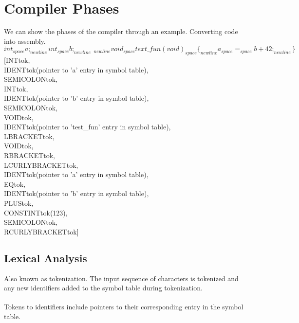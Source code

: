 \documentclass{report}
\begin{document}
    \section*{Compiler Phases}
        We can show the phases of the compiler through an example. Converting  code into  assembly.
        \[int_{space}a;_{newline}int_{space}b;_{newline} \ _{newline}void_{space}text\_fun(void)_{space}\{_{newline}a_{space}=_{space}b+42;_{newline}\}\]
        [INTtok,
        \\ IDENTtok(pointer to 'a' entry in symbol table),
        \\ SEMICOLONtok,
        \\ INTtok,
        \\ IDENTtok(pointer to 'b' entry in symbol table),
        \\ SEMICOLONtok,
        \\ VOIDtok,
        \\ IDENTtok(pointer to 'test\_fun' entry in symbol table),
        \\ LBRACKETtok,
        \\ VOIDtok,
        \\ RBRACKETtok,
        \\ LCURLYBRACKETtok,
        \\ IDENTtok(pointer to 'a' entry in symbol table),
        \\ EQtok,
        \\ IDENTtok(pointer to 'b' entry in symbol table),
        \\ PLUStok,
        \\ CONSTINTtok(123),
        \\ SEMICOLONtok,
        \\ RCURLYBRACKETtok]

        
        \subsection*{Lexical Analysis}
            Also known as tokenization. The input sequence of characters is tokenized and any new identifiers added to the symbol table during tokenization.
            \\
            \\ Tokens to identifiers include pointers to their corresponding entry in the symbol table.

        
\end{document}
